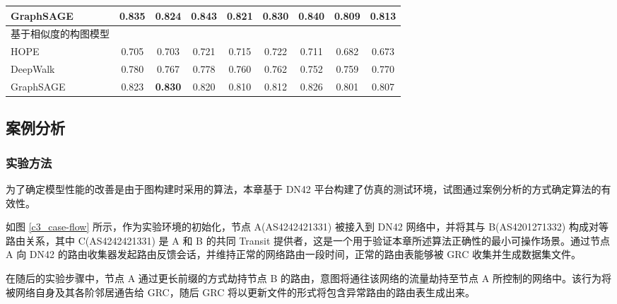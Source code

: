 \begin{table}
\begin{tabular}{lcccccccc}
        \quad GraphSAGE & \textbf{0.835}                & 0.824                         & \textbf{0.843}                & \textbf{0.821}                & \textbf{0.830} & \textbf{0.840} & \textbf{0.809} & \textbf{0.813} \\ \midrule
        基于相似度的构图模型                                                                                                                                                                                                          \\
        \quad HOPE      & 0.705                         & 0.703                         & 0.721                         & 0.715                         & 0.722          & 0.711          & 0.682          & 0.673
        \\
        \quad DeepWalk  & 0.780                         & 0.767                         & 0.778                         & 0.760                         & 0.762          & 0.752          & 0.759          & 0.770          \\
        \quad GraphSAGE & 0.823                         & \textbf{0.830}                & 0.820                         & 0.810                         & 0.812          & 0.826          & 0.801          & 0.807
        \\
        \bottomrule
    \end{tabular}
    \label{c3_s3tab}
\end{table}

\subsection{案例分析}

\subsubsection{实验方法}

为了确定模型性能的改善是由于图构建时采用的算法，本章基于 DN42 平台构建了仿真的测试环境，试图通过案例分析的方式确定算法的有效性。

如图 \ref{c3_case-flow} 所示，作为实验环境的初始化，节点 A(AS4242421331) 被接入到 DN42 网络中，并将其与 B(AS4201271332) 构成对等路由关系，其中 C(AS4242421331) 是 A 和 B 的共同 Transit 提供者，这是一个用于验证本章所述算法正确性的最小可操作场景。通过节点 A 向 DN42 的路由收集器发起路由反馈会话，并维持正常的网络路由一段时间，正常的路由表能够被 GRC 收集并生成数据集文件。

在随后的实验步骤中，节点 A 通过更长前缀的方式劫持节点 B 的路由，意图将通往该网络的流量劫持至节点 A 所控制的网络中。该行为将被网络自身及其各阶邻居通告给 GRC，随后 GRC 将以更新文件的形式将包含异常路由的路由表生成出来。

